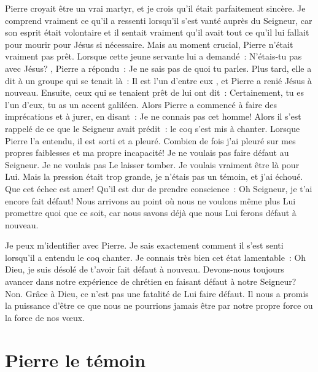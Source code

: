 Pierre croyait être un vrai martyr,
 et je crois qu'il était parfaitement sincère.
 Je comprend vraiment ce qu'il a ressenti lorsqu'il s'est vanté
 auprès du Seigneur, car son esprit était volontaire et il sentait
 vraiment qu'il avait tout ce qu'il lui fallait pour mourir pour Jésus
 si nécessaire. Mais au moment crucial, Pierre n'était vraiment pas prêt.
 Lorsque cette jeune servante lui a demandé~:
 \og N'étais-tu pas avec Jésus? \fg{}, Pierre a répondu~:
 \og Je ne sais pas de quoi tu parles. \fg{}
 Plus tard, elle a dit à un groupe qui se tenait là~:
 \og Il est l'un d'entre eux \fg{}, et Pierre a renié Jésus à nouveau.
 Ensuite, ceux qui se tenaient prêt de lui ont dit~:
 \og Certainement, tu es l'un d'eux, tu as un accent galiléen. \fg{}
 Alors Pierre a commencé à faire des imprécations et à jurer, en disant~:
 \og Je ne connais pas cet homme! \fg{}
 Alors il s'est rappelé de ce que le Seigneur avait prédit~:
 le coq s'est mis à chanter.
 Lorsque Pierre l'a entendu, il est sorti et a pleuré.
 Combien de fois j'ai pleuré sur mes propres faiblesses
 et ma propre incapacité! Je ne voulais pas faire défaut au Seigneur.
 Je ne voulais pas Le laisser tomber. Je voulais vraiment être là pour Lui.
 Mais la pression était trop grande, je n'étais pas un témoin,
 et j'ai échoué. Que cet échec est amer!
 Qu'il est dur de prendre conscience~:
 \og Oh Seigneur, je t'ai encore fait défaut! \fg{}
 Nous arrivons au point où nous ne voulons même plus Lui promettre quoi
 que ce soit, car nous savons déjà que nous Lui ferons défaut à nouveau.

Je peux m'identifier avec Pierre.
 Je sais exactement comment il s'est senti lorsqu'il a entendu le coq chanter.
 Je connais très bien cet état lamentable~:
 \og Oh Dieu, je suis désolé de t'avoir fait défaut à nouveau. \fg{}
 Devons-nous toujours avancer dans notre expérience de chrétien
 en faisant défaut à notre Seigneur? Non.
 Grâce à Dieu, ce n'est pas une fatalité de Lui faire défaut.
 Il nous a promis la puissance d'être ce que nous ne pourrions
 jamais être par notre propre force ou la force de nos vœux.


\section*{Pierre le témoin}

